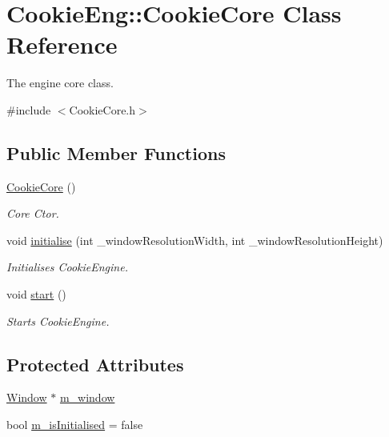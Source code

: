 \hypertarget{class_cookie_eng_1_1_cookie_core}{}\section{Cookie\+Eng\+:\+:Cookie\+Core Class Reference}
\label{class_cookie_eng_1_1_cookie_core}


The engine core class.  




{\ttfamily \#include $<$Cookie\+Core.\+h$>$}

\subsection*{Public Member Functions}
\begin{DoxyCompactItemize}
\item 
\hyperlink{class_cookie_eng_1_1_cookie_core_a4eca2aeec2dc76b06646bd5124de3d98}{Cookie\+Core} ()
\begin{DoxyCompactList}\small\item\em Core Ctor. \end{DoxyCompactList}\item 
void \hyperlink{class_cookie_eng_1_1_cookie_core_ac3921a88393cf927bce932958ba710b6}{initialise} (int \+\_\+window\+Resolution\+Width, int \+\_\+window\+Resolution\+Height)
\begin{DoxyCompactList}\small\item\em Initialises Cookie\+Engine. \end{DoxyCompactList}\item 
void \hyperlink{class_cookie_eng_1_1_cookie_core_a30f6d3ab2c753095de7d61c69dddbd87}{start} ()
\begin{DoxyCompactList}\small\item\em Starts Cookie\+Engine. \end{DoxyCompactList}\end{DoxyCompactItemize}
\subsection*{Protected Attributes}
\begin{DoxyCompactItemize}
\item 
\hyperlink{class_cookie_eng_1_1_window}{Window} $\ast$ \hyperlink{class_cookie_eng_1_1_cookie_core_ab95ee714d9d00c4a43859d0e427ea577}{m\+\_\+window}
\item 
bool \hyperlink{class_cookie_eng_1_1_cookie_core_a56072701bf07b2f787081cf41f5ae254}{m\+\_\+is\+Initialised} = false
\end{DoxyCompactItemize}


